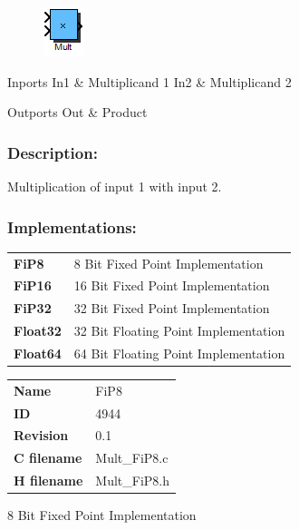 \label{block:Mult}
\begin{figure}[H]\includegraphics{Mult}\end{figure} 

\begin{XtoCtabular}{Inports}
In1 & Multiplicand 1\tabularnewline
\hline
In2 & Multiplicand 2\tabularnewline
\hline
\end{XtoCtabular}


\begin{XtoCtabular}{Outports}
Out & Product\tabularnewline
\hline
\end{XtoCtabular}

\subsubsection*{Description:}
Multiplication of input 1 with input 2.


\subsubsection*{Implementations:}
\begin{tabular}{l l}
\textbf{FiP8} & 8 Bit Fixed Point Implementation\tabularnewline
\textbf{FiP16} & 16 Bit Fixed Point Implementation\tabularnewline
\textbf{FiP32} & 32 Bit Fixed Point Implementation\tabularnewline
\textbf{Float32} & 32 Bit Floating Point Implementation\tabularnewline
\textbf{Float64} & 64 Bit Floating Point Implementation\tabularnewline
\end{tabular}

\nopagebreak[0]
\begin{tabular}{l l}
\textbf{Name} & FiP8 \tabularnewline
\textbf{ID} & 4944 \tabularnewline
\textbf{Revision} & 0.1 \tabularnewline
\textbf{C filename} & Mult\_FiP8.c \tabularnewline
\textbf{H filename} & Mult\_FiP8.h \tabularnewline
\end{tabular}
\vspace{1ex}

8 Bit Fixed Point Implementation

